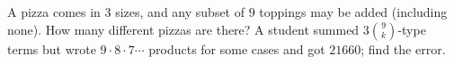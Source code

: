 A pizza comes in $3$ sizes, and any subset of $9$ toppings may be added (including none). How many different pizzas are there? A student summed $3\binom9k$-type terms but wrote $9\cdot8\cdot7\cdots$ products for some cases and got $21660$; find the error.
